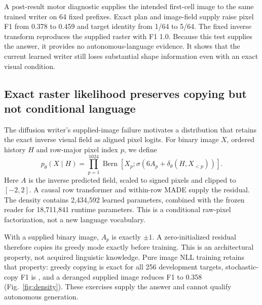 A post-result motor diagnostic supplies the intended first-cell image to the
same trained writer on 64 fixed prefixes. Exact plan and image-field supply
raise pixel F1 from 0.378 to 0.459 and target identity from 1/64 to 5/64.
The fixed inverse transform reproduces the supplied raster with F1 1.0.
Because this test supplies the answer, it provides no autonomous-language
evidence. It shows that the current learned writer still loses substantial
shape information even with an exact visual condition.


\subsection*{Exact raster likelihood preserves copying but not conditional language}
The diffusion writer's supplied-image failure motivates a distribution that
retains the exact inverse visual field as aligned pixel logits. For binary
image $X$, ordered history $H$ and row-major pixel index $p$, we define
\begin{equation}
p_\theta(X\mid H)=\prod_{p=1}^{1024}
\operatorname{Bern}\!\left[X_p;\sigma(6A_p+\delta_\theta(H,X_{<p}))\right].
\end{equation}
Here $A$ is the inverse predicted field, scaled to signed pixels and clipped
to $[-2,2]$. A causal row transformer and within-row MADE supply the residual.
The density contains 2,434,592 learned parameters, combined with the frozen
reader for 18,711,841 runtime parameters. This is a conditional raw-pixel
factorization\cite{pixelrnn,pixelcnn,made}, not a new language vocabulary.

With a supplied binary image, $A_p$ is exactly $\pm1$. A zero-initialized
residual therefore copies its greedy mode exactly before training. This is an
architectural property, not acquired linguistic knowledge. Pure image NLL
training retains that property: greedy copying is exact for all 256 development
targets, stochastic-copy F1 is \DensityCopyFone, and a deranged supplied image
reduces F1 to 0.358 (Fig.~\ref{fig:density}). These exercises supply the answer
and cannot qualify autonomous generation.

